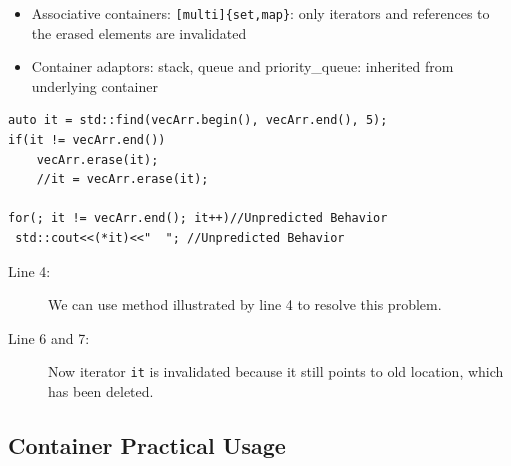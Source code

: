 \documentclass[a4paper,11pt,twoside]{book}
\begin{document}
\begin{itemize}
\begin{description}
\begin{itemize}
			\item Associative containers: \texttt{[multi]\{set,map\}}: only iterators and references to the erased elements are invalidated
			
			\item Container adaptors: stack, queue and priority\_queue: inherited from underlying container
	\end{itemize}

\begin{lstlisting}[]
auto it = std::find(vecArr.begin(), vecArr.end(), 5);
if(it != vecArr.end())
	vecArr.erase(it);
    //it = vecArr.erase(it);

for(; it != vecArr.end(); it++)//Unpredicted Behavior
 std::cout<<(*it)<<"  "; //Unpredicted Behavior
\end{lstlisting}
\begin{description}
	\item[Line 4:] We can use method illustrated by line 4 to resolve this problem.
	
	\item[Line 6 and 7:]  Now iterator \texttt{it} is invalidated because it still points to old location, which has been deleted.
\end{description}

\end{description}

\end{itemize}

\subsection{Container Practical Usage}
\end{document}
